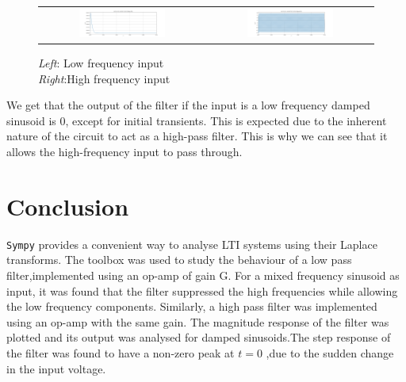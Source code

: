 \documentclass[11pt, a4paper, twoside]{article}
\begin{document}
\begin{figure}[H]
    \centering
    \setlength\tabcolsep{1pt}
    \begin{tabular}{cc}
        \includegraphics[width=0.55\textwidth]{plots/Fig 8.png} &
        \includegraphics[width=0.55\textwidth]{plots/Fig 9.png}\\
    \end{tabular}
    \caption{\textit{Left}: Low frequency input\\\textit{Right}:High frequency input}
\end{figure}

We get that the output of the filter if the input is a low frequency damped sinusoid is 0, except for initial transients. This is expected due to the inherent nature of the circuit to act as a high-pass filter. This is why we can see that it allows the high-frequency input to pass through.

\section{Conclusion}
\texttt{Sympy} provides a convenient way to analyse LTI systems using their Laplace transforms.  The toolbox was used to study the behaviour of a low pass filter,implemented using an op-amp of gain G. For a mixed frequency sinusoid as input,  it  was  found  that  the  filter  suppressed  the  high  frequencies  while allowing  the  low  frequency  components.   Similarly,  a  high  pass  filter  was implemented using an op-amp with the same gain.  The magnitude response of the filter was plotted and its output was analysed for damped sinusoids.The step response of the filter was found to have a non-zero peak at $t= 0$ ,due to the sudden change in the input voltage.
\end{document}
